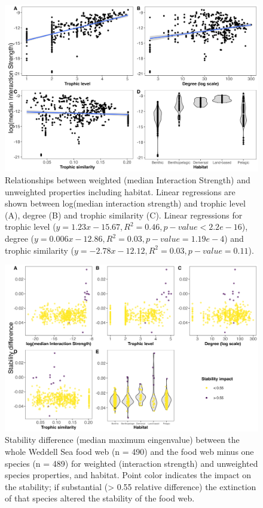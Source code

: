 \documentclass[gc, manuscript]{copernicus}
\begin{document}
\begin{figure}
\includegraphics[width=12cm]{Fig4_LinReg_sim} \caption{Relationships between weighted (median Interaction Strength) and unweighted properties including habitat. Linear regressions are shown between log(median interaction strength) and trophic level (A), degree (B) and trophic similarity (C). Linear regressions for trophic level ($y = 1.23x - 15.67, R^2 = 0.46, p-value < 2.2e-16$), degree ($y = 0.006x - 12.86, R^2 = 0.03, p-value = 1.19e-4$) and trophic similarity ($y = -2.78x - 12.12, R^2 = 0.03, p-value = 0.11$).}\label{fig:unnamed-chunk-4}
\end{figure}

\clearpage

\begin{figure}
\includegraphics[width=12cm]{Fig.5_QSSDif} \caption{Stability  difference (median maximum eingenvalue) between the whole Weddell Sea food web (n = 490) and the food web minus one species (n = 489) for weighted (interaction strength) and unweighted species properties, and habitat. Point color indicates the impact on the stability; if substantial (> 0.55 relative difference) the extinction of that species altered the stability of the food web.}\label{fig:unnamed-chunk-5}
\end{figure}
\end{document}
